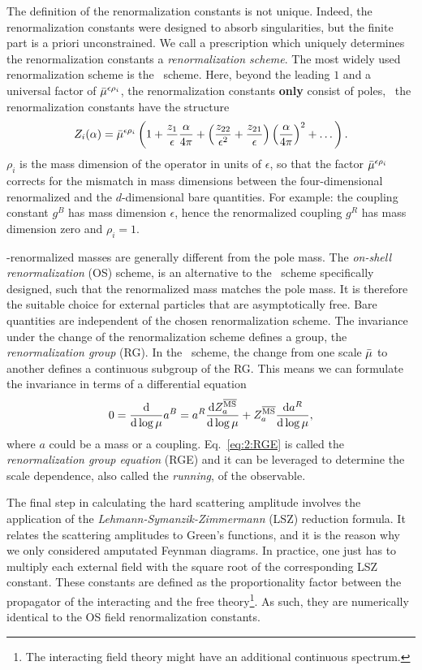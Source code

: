 The definition of the renormalization constants is not unique. Indeed, the renormalization constants were designed to absorb singularities, but the finite part is a priori unconstrained. We call a prescription which uniquely determines the renormalization constants a \textit{renormalization scheme}. The most widely used renormalization scheme is the \MS\ scheme. Here, beyond the leading $1$ and a universal factor of $\bar{\mu}^{\epsilon \rho_i}$, the renormalization constants \textbf{only} consist of poles, \ie\ the renormalization constants have the structure
\begin{equation}
Z_i(\alpha) = \bar{\mu}^{\epsilon \rho_i} \left(1 + \frac{z_1}{\epsilon} \frac{\alpha}{4 \pi} + \left(\frac{z_{22}}{\epsilon^2} + \frac{z_{21}}{\epsilon} \right) \left( \frac{\alpha}{4 \pi} \right)^2 + \dots \right).
\end{equation}
$\rho_i$ is the mass dimension of the operator in units of $\epsilon$, so that the factor $\bar{\mu}^{\epsilon \rho_i}$ corrects for the mismatch in mass dimensions between the four-dimensional renormalized and the $d$-dimensional bare quantities. For example: the coupling constant $g^B$ has mass dimension $\epsilon$, hence the renormalized coupling $g^R$ has mass dimension zero and $\rho_i = 1$.

\MS-renormalized masses are generally different from the pole mass. The \textit{on-shell renormalization} (\acs{OS}) scheme, is an alternative to the \MS\ scheme specifically designed, such that the renormalized mass matches the pole mass. It is therefore the suitable choice for external particles that are asymptotically free. Bare quantities are independent of the chosen renormalization scheme. The invariance under the change of the renormalization scheme defines a group, the \textit{renormalization group} (\acs{RG}). In the \MS\ scheme, the change from one scale $\bar{\mu}$ to another defines a continuous subgroup of the \acs{RG}. This means we can formulate the invariance in terms of a differential equation
\begin{equation}
0 = \frac{\mathrm{d}}{\mathrm{d} \log \mu} a^B  = a^R \frac{\mathrm{d} Z^{\overline{\mathrm{MS}}}_a}{\mathrm{d} \log \mu} + Z^{\overline{\mathrm{MS}}}_a \frac{\mathrm{d} a^R}{\mathrm{d} \log \mu},
\label{eq:2:RGE}
\end{equation}
where $a$ could be a mass or a coupling. Eq.~\eqref{eq:2:RGE} is called the \textit{renormalization group equation} (\acs{RGE}) and it can be leveraged to determine the scale dependence, also called the \textit{running}, of the observable.

The final step in calculating the hard scattering amplitude involves the application of the \textit{Lehmann-Symanzik-Zimmermann} (LSZ) reduction formula. It relates the scattering amplitudes to Green's functions, and it is the reason why we only considered amputated Feynman diagrams. In practice, one just has to multiply each external field with the square root of the corresponding LSZ constant. These constants are defined as the proportionality factor between the propagator of the interacting and the free theory\footnote{The interacting field theory might have an additional continuous spectrum.}. As such, they are numerically identical to the \acs{OS} field renormalization constants.

